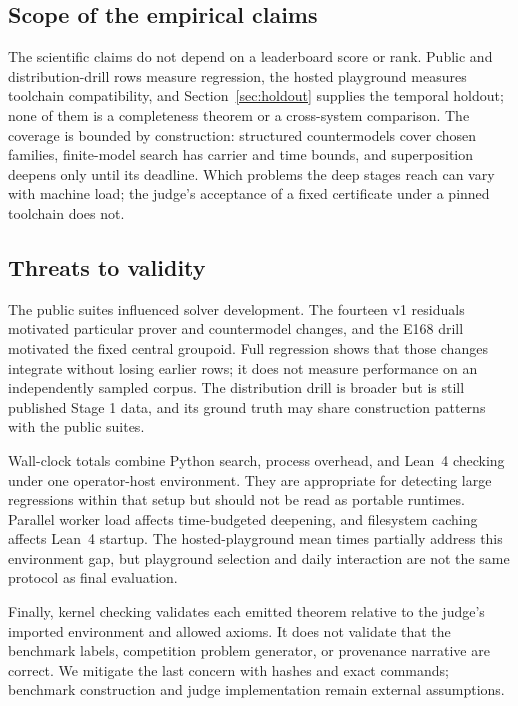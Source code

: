 \documentclass[10pt,twocolumn]{article}
\newcommand{\lean}{Lean~4\xspace}
\begin{document}
\subsection{Scope of the empirical claims}

The scientific claims do not depend on a leaderboard score or rank.  Public
and distribution-drill rows measure regression, the hosted playground measures
toolchain compatibility, and Section~\ref{sec:holdout} supplies the temporal
holdout; none of them is a completeness theorem or a cross-system comparison.
The coverage is bounded by construction: structured countermodels cover chosen
families, finite-model search has carrier and time bounds, and superposition
deepens only until its deadline.  Which problems the deep stages reach can
vary with machine load; the judge's acceptance of a fixed certificate under a
pinned toolchain does not.

\subsection{Threats to validity}

The public suites influenced solver development.  The fourteen v1 residuals
motivated particular prover and countermodel changes, and the E168 drill
motivated the fixed central groupoid.  Full regression shows that those
changes integrate without losing earlier rows; it does not measure performance
on an independently sampled corpus.  The distribution drill is broader but is
still published Stage 1 data, and its ground truth may share construction
patterns with the public suites.

Wall-clock totals combine Python search, process overhead, and \lean checking
under one operator-host environment.  They are appropriate for detecting large
regressions within that setup but should not be read as portable runtimes.
Parallel worker load affects time-budgeted deepening, and filesystem caching
affects \lean startup.  The hosted-playground mean times partially address this
environment gap, but playground selection and daily interaction are not the
same protocol as final evaluation.

Finally, kernel checking validates each emitted theorem relative to the
judge's imported environment and allowed axioms.  It does not validate that
the benchmark labels, competition problem generator, or provenance narrative
are correct.  We mitigate the last concern with hashes and exact commands;
benchmark construction and judge implementation remain external assumptions.
\end{document}
